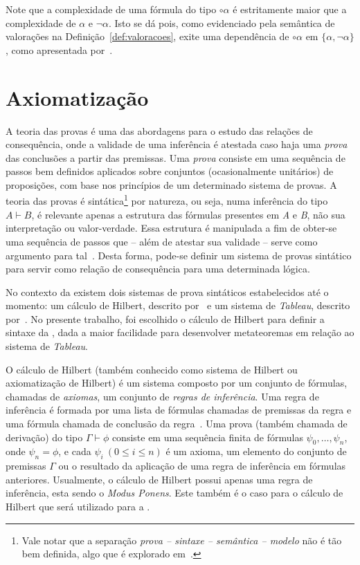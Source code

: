     Note que a complexidade de uma fórmula do tipo $\circ \alpha$ é estritamente maior que a complexidade de $\alpha$ e $\neg \alpha$. Isto se dá pois, como evidenciado pela semântica de valorações na Definição~\ref{def:valoracoes}, exite uma dependência de $\circ \alpha$ em $\{\alpha, \neg \alpha\}$, como apresentada por~.

\section{Axiomatização}\label{sec:axiomatizacao}

    A teoria das provas é uma das abordagens para o estudo das relações de consequência, onde a validade de uma inferência é atestada caso haja uma \textit{prova} das conclusões a partir das premissas. Uma \textit{prova} consiste em uma sequência de passos bem definidos aplicados sobre conjuntos (ocasionalmente unitários) de proposições, com base nos princípios de um determinado sistema de provas. A teoria das provas é sintática\footnote{Vale notar que a separação \textit{prova {--} sintaxe {--} semântica {--} modelo} não é tão bem definida, algo que é explorado em~.} por natureza, ou seja, numa inferência do tipo $A \vdash B$, é relevante apenas a estrutura das fórmulas presentes em \textit{A} e \textit{B}, não sua interpretação ou valor-verdade. Essa estrutura é manipulada a fim de obter-se uma sequência de passos que {--} além de atestar sua validade {--} serve como argumento para tal~\cite{sep-logical-consequence}. Desta forma, pode-se definir um sistema de provas sintático para servir como relação de consequência para uma determinada lógica. 

    No contexto da \lfium{} existem dois sistemas de prova sintáticos estabelecidos até o momento: um cálculo de Hilbert, descrito por~ e um sistema de \textit{Tableau}, descrito por~. No presente trabalho, foi escolhido o cálculo de Hilbert para definir a sintaxe da \lfium{}, dada a maior facilidade para desenvolver metateoremas em relação ao sistema de \textit{Tableau}.

    O cálculo de Hilbert (também conhecido como sistema de Hilbert ou axiomatização de Hilbert) é um sistema composto por um conjunto de fórmulas, chamadas de \textit{axiomas}, um conjunto de \textit{regras de inferência}. Uma regra de inferência é formada por uma lista de fórmulas chamadas de premissas da regra e uma fórmula chamada de conclusão da regra~\cite{Restall1999-RESAIT-4}. Uma prova (também chamada de derivação) do tipo $\Gamma \vdash \phi$ consiste em uma sequência finita de fórmulas \(\psi_0, \dots, \psi_n\), onde \(\psi_n = \phi\), e cada  $\psi_i\ (0 \leq i \leq n)$ é um axioma, um elemento do conjunto de premissas $\Gamma$ ou o resultado da aplicação de uma regra de inferência em fórmulas anteriores. Usualmente, o cálculo de Hilbert possui apenas uma regra de inferência, esta sendo o \textit{Modus Ponens}. Este também é o caso para o cálculo de Hilbert que será utilizado para a \lfium{}.
    
